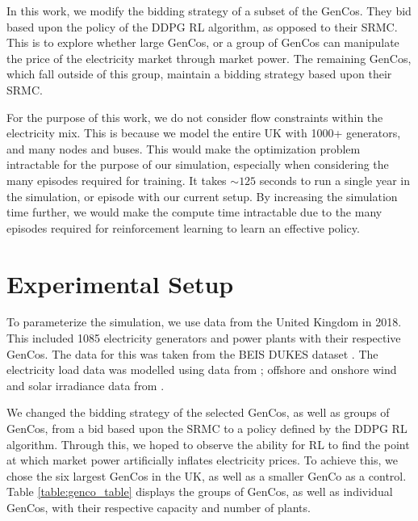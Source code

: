 \documentclass[conference]{IEEEtran}
\begin{document}
In this work, we modify the bidding strategy of a subset of the GenCos. They bid based upon the policy of the DDPG RL algorithm, as opposed to their SRMC. This is to explore whether large GenCos, or a group of GenCos can manipulate the price of the electricity market through market power. The remaining GenCos, which fall outside of this group, maintain a bidding strategy based upon their SRMC.

For the purpose of this work, we do not consider flow constraints within the electricity mix. This is because we model the entire UK with 1000+ generators, and many nodes and buses. This would make the optimization problem intractable for the purpose of our simulation, especially when considering the many episodes required for training. It takes ${\sim}125$ seconds to run a single year in the simulation, or episode with our current setup. By increasing the simulation time further, we would make the compute time intractable due to the many episodes required for reinforcement learning to learn an effective policy.










\section{Experimental Setup}
\label{sec:methodology}


To parameterize the simulation, we use data from the United Kingdom in 2018. This included 1085 electricity generators and power plants with their respective GenCos. The data for this was taken from the BEIS DUKES dataset \cite{dukes_511}. The electricity load data was modelled using data from \cite{gridwatch}; offshore and onshore wind and solar irradiance data from \cite{Pfenninger2016}.

We changed the bidding strategy of the selected GenCos, as well as groups of GenCos, from a bid based upon the SRMC to a policy defined by the DDPG RL algorithm. Through this, we hoped to observe the ability for RL to find the point at which market power artificially inflates electricity prices. To achieve this, we chose the six largest GenCos in the UK, as well as a smaller GenCo as a control. Table \ref{table:genco_table} displays the groups of GenCos, as well as individual GenCos, with their respective capacity and number of plants.
\end{document}

